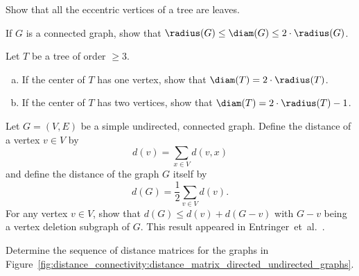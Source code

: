 \begin{problem}
\item\label{prob:distance_connectivity:eccentric_vertices_laves} Show
  that all the eccentric vertices of a tree are leaves.

\item If $G$ is a connected graph, show that
  $\radius(G) \leq \diam(G) \leq 2 \cdot \radius(G)$.

\item Let $T$ be a tree of order $\geq 3$.
  \begin{enumerate}[(a)]
  \item If the center of $T$ has one vertex, show that
    $\diam(T) = 2 \cdot \radius(T)$.

  \item If the center of $T$ has two vertices, show that
    $\diam(T) = 2 \cdot \radius(T) - 1$.
  \end{enumerate}

\item Let $G = (V,E)$ be a simple undirected, connected graph. Define
  the distance of a vertex $v \in V$ by
  \[
  d(v)
  =
  \sum_{x \in V} d(v,x)
  \]
  and define the distance of the graph $G$ itself by
  \[
  d(G)
  =
  \frac{1}{2} \sum_{v \in V} d(v).
  \]
  For any vertex $v \in V$, show that
  $d(G) \leq d(v) + d(G - v)$ with $G - v$ being a vertex deletion
  subgraph of $G$. This result appeared in
  Entringer~et~al.~\cite[p.284]{EntringerEtAl1976}.

\item Determine the sequence of distance matrices for the graphs in
  Figure~\ref{fig:distance_connectivity:distance_matrix_directed_undirected_graphs}.
\end{problem}
